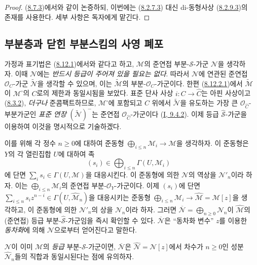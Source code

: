 \begin{proof}
(\hyperref[II.8.7.3-ko]{8.7.3})에서와 같이 논증하되, 이번에는
(\hyperref[II.8.2.7.3-ko]{8.2.7.3}) 대신 di-동형사상
(\hyperref[II.8.2.9.3-ko]{8.2.9.3})의 존재를 사용한다. 세부 사항은
독자에게 맡긴다.
\end{proof}

\subsection{부분층과 닫힌 부분스킴의 사영 폐포}
\label{subsection:II.8.13-ko}

\begin{env}[8.13.1]
\label{II.8.13.1-ko}
가정과 표기법은 (\hyperref[II.8.12.1-ko]{8.12.1})에서와 같다고 하고,
$\mathcal{M}$의 준연접 부분-$\mathcal{S}$-가군 $\mathcal{N}$을
생각하자. 이때 $\mathcal{N}$에는 \emph{반드시 등급이 주어져 있을
필요는 없다}. 따라서 $\mathcal{N}$에 연관된 준연접
$\mathcal{O}_C$-가군 $\widetilde{\mathcal{N}}$을 생각할 수 있으며,
이는 $\widetilde{\mathcal{M}}$의 부분-$\mathcal{O}_C$-가군이다. 한편
(\hyperref[II.8.12.2.1-ko]{8.12.2.1})에서
$\widetilde{\mathcal{M}}$이 $\mathcal{M}^{\square}$의 $C$로의 제한과
동일시됨을 보았다. 표준 단사 사상 $i:C\to\widehat{C}$는 아핀 사상이고
(\hyperref[II.8.3.2-ko]{8.3.2}), \emph{더구나} 준콤팩트하므로,
$\mathcal{M}^{\square}$에 포함되고 $C$ 위에서
$\widetilde{\mathcal{N}}$을 유도하는 가장 큰
$\mathcal{O}_{\widehat{C}}$-부분가군인
\emph{표준 연장} $(\widetilde{\mathcal{N}})^{-}$는 준연접
$\mathcal{O}_{\widehat{C}}$-가군이다
(\hyperref[I.9.4.2-ko]{I, 9.4.2}). 이제 등급
$\widehat{\mathcal{S}}$-가군을 이용하여 이것을 명시적으로
기술하겠다.
\end{env}

\begin{env}[8.13.2]
\label{II.8.13.2-ko}
이를 위해 각 정수 $n\geqslant0$에 대하여 준동형
$\bigoplus_{i\leqslant n}\mathcal{M}_i\to\mathcal{M}$을 생각하자.
이 준동형은 $Y$의 각 열린집합 $U$에 대하여 족
\[
  (s_i)\in\bigoplus_{i\leqslant n}\Gamma(U,\mathcal{M}_i)
\]
에 단면 $\sum_i s_i\in\Gamma(U,\mathcal{M})$을 대응시킨다.
이 준동형에 의한 $\mathcal{N}$의 역상을 $\mathcal{N}'_n$이라 하자.
이는 $\bigoplus_{i\leqslant n}\mathcal{M}_i$의 준연접
부분-$\mathcal{O}_Y$-가군이다. 이제 $(s_i)$에 단면
$\sum_{i\leqslant n}s_i z^{n-i}\in
\Gamma(U,\widehat{\mathcal{M}}_n)$을 대응시키는 준동형
$\bigoplus_{i\leqslant n}\mathcal{M}_i\to
\widehat{\mathcal{M}}=\mathcal{M}[z]$을 생각하고, 이 준동형에 의한
$\mathcal{N}'_n$의 상을 $\mathcal{N}_n$이라 하자. 그러면
$\overline{\mathcal{N}}=\bigoplus_{n\geqslant0}\mathcal{N}_n$이
$\widehat{\mathcal{M}}$의 (준연접) 등급
부분-$\widehat{\mathcal{S}}$-가군임을 즉시 확인할 수 있다.
$\overline{\mathcal{N}}$은 “동차화 변수” $z$를 이용한
\emph{동차화}에 의해 $\mathcal{N}$으로부터 얻어진다고 말한다.

$\mathcal{N}$이 이미 $\mathcal{M}$의 \emph{등급}
부분-$\mathcal{S}$-가군이면, $\overline{\mathcal{N}}$은
$\widehat{\mathcal{N}}=\mathcal{N}[z]$에서 차수가 $n\geqslant0$인
성분 $\widehat{\mathcal{N}}_n$들의 직합과 동일시된다는 점에
유의하자.
\end{env}

